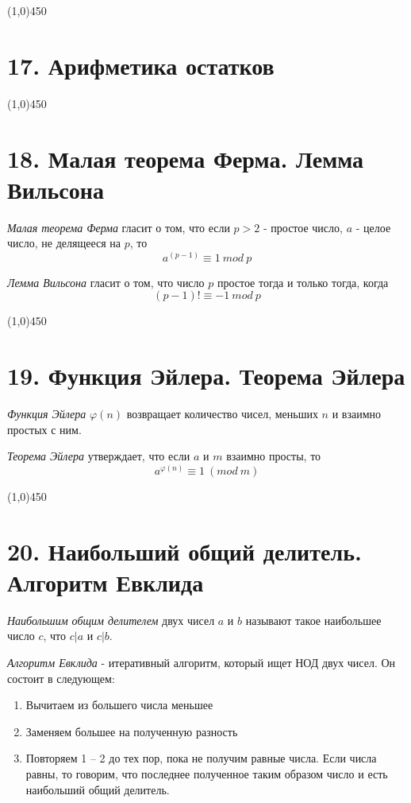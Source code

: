 \documentclass[a4paper,12pt]{article}
\renewcommand{\phi}{\varphi}
\begin{document}
	\begin{center}
		\line(1,0){450}
	\end{center}
	
	\section*{17. Арифметика остатков}
	
	\begin{center}
		\line(1,0){450}
	\end{center}

	\section*{18. Малая теорема Ферма. Лемма Вильсона}
	\textit{Малая теорема Ферма} гласит о том, что если $p > 2$ - простое число, $a$ - целое число, не делящееся на $p$, то
	\[
	a^{(p-1)} \equiv 1 \ mod \ p
	\]
	
	\textit{Лемма Вильсона} гласит о том, что число $p$ простое тогда и только тогда, когда 
	\[
	(p - 1)! \equiv -1 \ mod \ p
	\]
	
	\begin{center}
		\line(1,0){450}
	\end{center}

	\section*{19. Функция Эйлера. Теорема Эйлера}
	\textit{Функция Эйлера} $\phi(n)$ возвращает количество чисел, меньших $n$ и взаимно простых с ним.
	
	\textit{Теорема Эйлера} утверждает, что если $a$ и $m$ взаимно просты, то 
	\[
	a^{\phi(n)} \equiv 1 \ (mod \ m)
	\]
	
	\begin{center}
		\line(1,0){450}
	\end{center}

	\section*{20. Наибольший общий делитель. Алгоритм Евклида}
	\textit{Наибольшим общим делителем} двух чисел $a$ и $b$ называют такое наибольшее число $c$, что $c|a$ и $c|b$.
	
	\textit{Алгоритм Евклида} - итеративный алгоритм, который ищет НОД двух чисел. Он состоит в следующем:
	\begin{enumerate}
		\item Вычитаем из большего числа меньшее
		\item Заменяем большее на полученную разность
		\item Повторяем 1 -- 2 до тех пор, пока не получим равные числа. Если числа равны, то говорим, что последнее полученное таким образом число и есть наибольший общий делитель.
	\end{enumerate}
\end{document}

